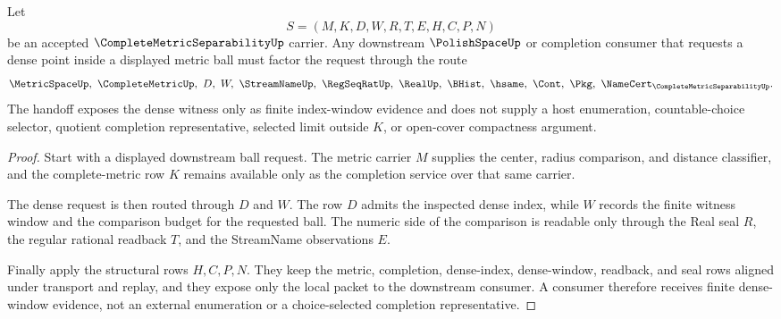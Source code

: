 \begin{theorem}
\label{thm:complete-metric-separability-density-handoff}
Let
$$
S=(M,K,D,W,R,T,E,H,C,P,N)
$$
be an accepted $\CompleteMetricSeparabilityUp$ carrier. Any downstream $\PolishSpaceUp$ or completion consumer that requests a dense point inside a displayed metric ball must factor the request through the route
$$
\MetricSpaceUp,\ \CompleteMetricUp,\ D,\ W,\ \StreamNameUp,\ \RegSeqRatUp,\ \RealUp,\ \BHist,\ \hsame,\ \Cont,\ \Pkg,\ \NameCert_{\CompleteMetricSeparabilityUp}.
$$
The handoff exposes the dense witness only as finite index-window evidence and does not supply a host enumeration, countable-choice selector, quotient completion representative, selected limit outside $K$, or open-cover compactness argument.
\end{theorem}
\begin{proof}
Start with a displayed downstream ball request. The metric carrier $M$ supplies the center, radius comparison, and distance classifier, and the complete-metric row $K$ remains available only as the completion service over that same carrier.

The dense request is then routed through $D$ and $W$. The row $D$ admits the inspected dense index, while $W$ records the finite witness window and the comparison budget for the requested ball. The numeric side of the comparison is readable only through the Real seal $R$, the regular rational readback $T$, and the StreamName observations $E$.

Finally apply the structural rows $H,C,P,N$. They keep the metric, completion, dense-index, dense-window, readback, and seal rows aligned under transport and replay, and they expose only the local packet to the downstream consumer. A consumer therefore receives finite dense-window evidence, not an external enumeration or a choice-selected completion representative.
\end{proof}


